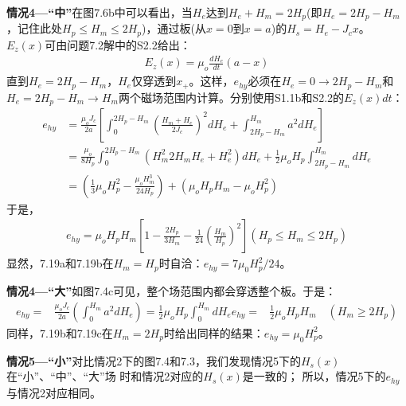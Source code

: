 \textbf{情况4---“中”}\quad 在图7.6b中可以看出，当$H_e$达到$H_e+H_m=2H_p$(即$H_e=2H_p-H_m$，记住此处$H_p\le H_m\le 2H_p$)，通过板(从$x=0$到$x=a$)的$H_s=H_e-J_c x$。$E_z(x)$可由问题7.2解中的S2.2给出：
\begin{align*}%
E_z(x)=\mu_o\frac{dH_e}{dt}(a-x) \tag{S2.2}
\end{align*}
直到$H_e=2H_p-H_m$，$H_e$仅穿透到$x_+$。这样，$e_{hy}$必须在$H_e=0\rightarrow 2H_p-H_m$和
$H_e=2H_p-H_m\rightarrow H_m$两个磁场范围内计算。分别使用S1.1b和S2.2的$E_z(x)dt$：
\begin{align*}%
e_{hy}&=\frac{\mu_oJ_c}{2a}\left[\int_{0}^{2H_p-H_m}\left(\frac{H_m+H_e}{2J_c}\right)^2dH_e+\int_{2H_p-H_m}^{H_m}a^2dH_e\right] \\
&=\frac{\mu_o}{8H_p}\int_{0}^{2H_p-H_m}(H_{m}^{2}2H_mH_e+H_{e}^{2})dH_e+\frac{1}{2}\mu_oH_p\int_{2H_p-H_m}^{H_m}dH_e \\
&=\left(\frac{1}{3}\mu_oH_{p}^{2}-\frac{\mu_oH_{m}^{3}}{24H_p}\right)+(\mu_oH_pH_m-\mu_oH_{p}^{2}) 
\end{align*}
于是，
\begin{align*}
e_{hy}=\mu_oH_pH_m\left[1-\frac{2H_p}{3H_m}-\frac{1}{24}\left(\frac{H_m}{H_p}\right)^2\right]      (H_p\leq H_m\leq 2H_p)
\end{align*}
显然，7.19a和7.19b在$H_m=H_p$时自洽：$e_{hy}=7\mu_0 H_p^2/24$。

\textbf{情况4---“大”}\quad 如图7.4c可见，整个场范围内都会穿透整个板。于是：
\begin{align*}%
e_{hy}=&\frac{\mu_oJ_c}{2a}\left(\int_{0}^{H_m}a^2dH_e\right)=\frac{1}{2}\mu_oH_p\int_{0}^{H_m}dH_e
e_{hy}=&\frac{1}{2}\mu_oH_pH_m \quad (H_m\geq 2H_p) \tag{7.19c}
\end{align*}
同样，7.19b和7.19c在$H_m=2H_p$时给出同样的结果：$e_{hy}=\mu_0 H_p^2$。

\textbf{情况5---“小”}\quad 对比情况2下的图7.4和7.3，我们发现情况5下的$H_s(x)$在“小”、“中”、“大”场
时和情况2对应的$H_s(x)$是一致的；
所以，情况5下的$e_{hy}$与情况2对应相同。

